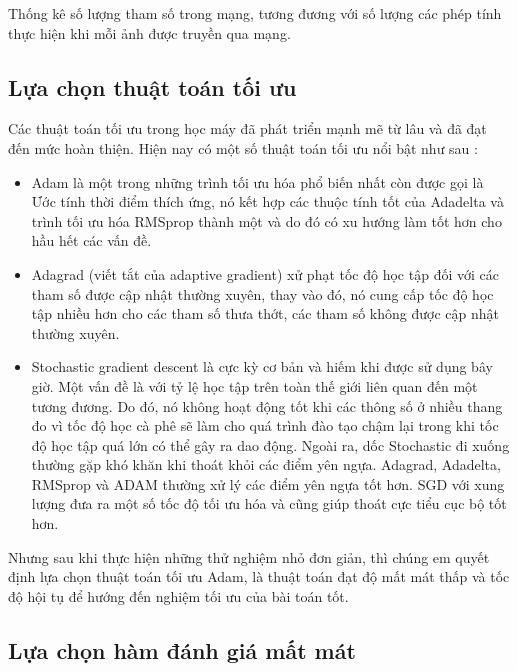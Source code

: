 Thống kê số lượng tham số trong mạng, tương đương với số lượng các phép tính thực hiện
khi mỗi ảnh được truyền qua mạng.




\subsection{Lựa chọn thuật toán tối ưu}

Các thuật toán tối ưu trong học máy đã phát triển mạnh mẽ từ lâu và đã đạt đến mức hoàn thiện.
Hiện nay có một số thuật toán tối ưu nổi bật như sau :
\begin{itemize}[leftmargin=1.5cm]
    \item Adam \cite{Adadelta} là một trong những trình tối ưu hóa phổ biến nhất còn được gọi là Ước tính thời điểm thích ứng, nó kết hợp các thuộc tính tốt của Adadelta và trình tối ưu hóa RMSprop thành một và do đó có xu hướng làm tốt hơn cho hầu hết các vấn đề.
    \item Adagrad \cite{Adagrad} (viết tắt của adaptive gradient) xử phạt tốc độ học tập đối với các tham số được cập nhật thường xuyên, thay vào đó, nó cung cấp tốc độ học tập nhiều hơn cho các tham số thưa thớt, các tham số không được cập nhật thường xuyên.
    \item Stochastic gradient descent \cite{svd} là cực kỳ cơ bản và hiếm khi được sử dụng bây giờ. Một vấn đề là với tỷ lệ học tập trên toàn thế giới liên quan đến một tương đương. Do đó, nó không hoạt động tốt khi các thông số ở nhiều thang đo vì tốc độ học cà phê sẽ làm cho quá trình đào tạo chậm lại trong khi tốc độ học tập quá lớn có thể gây ra dao động. Ngoài ra, dốc Stochastic đi xuống thường gặp khó khăn khi thoát khỏi các điểm yên ngựa. Adagrad, Adadelta, RMSprop và ADAM thường xử lý các điểm yên ngựa tốt hơn. SGD với xung lượng đưa ra một số tốc độ tối ưu hóa và cũng giúp thoát cực tiểu cục bộ tốt hơn.
\end{itemize}

Nhưng sau khi thực hiện những thử nghiệm nhỏ đơn giản, thì chúng em quyết định
lựa chọn thuật toán tối ưu Adam, là thuật toán đạt độ mất mát thấp và tốc độ hội tụ
để hướng đến nghiệm tối ưu của bài toán tốt.


\subsection{Lựa chọn hàm đánh giá mất mát}

